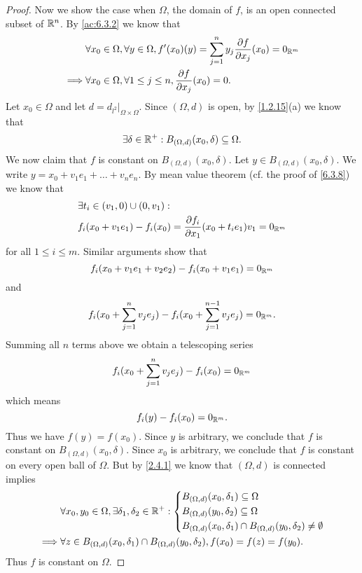\begin{proof}
  Now we show the case when \(\Omega\), the domain of \(f\), is an open connected subset of \(\mathbb{R}^n\).
  By \cref{ac:6.3.2} we know that
  \begin{align*}
             & \forall x_0 \in \Omega, \forall y \in \Omega, f'(x_0)(y) = \sum_{j = 1}^n y_j \dfrac{\partial f}{\partial x_j}(x_0) = 0_{\mathbb{R}^m} \\
    \implies & \forall x_0 \in \Omega, \forall 1 \leq j \leq n, \dfrac{\partial f}{\partial x_j}(x_0) = 0.
  \end{align*}
  Let \(x_0 \in \Omega\) and let \(d = d_{l^2}|_{\Omega \times \Omega}\).
  Since \((\Omega, d)\) is open, by \cref{1.2.15}(a) we know that
  \[
    \exists \delta \in \mathbb{R}^+ : B_{(\Omega, d)}(x_0, \delta) \subseteq \Omega.
  \]
  We now claim that \(f\) is constant on \(B_{(\Omega, d)}(x_0, \delta)\).
  Let \(y \in B_{(\Omega, d)}(x_0, \delta)\).
  We write \(y = x_0 + v_1 e_1 + \dots + v_n e_n\).
  By mean value theorem (cf. the proof of \cref{6.3.8}) we know that
  \begin{align*}
     & \exists t_i \in (v_1, 0) \cup (0, v_1) :                                                         \\
     & f_i(x_0 + v_1 e_1) - f_i(x_0) = \dfrac{\partial f_i}{\partial x_1}(x_0 + t_i e_1) v_1 = 0_{\mathbb{R}^m}
  \end{align*}
  for all \(1 \leq i \leq m\).
  Similar arguments show that
  \[
    f_i(x_0 + v_1 e_1 + v_2 e_2) - f_i(x_0 + v_1 e_1) = 0_{\mathbb{R}^m}
  \]
  and
  \[
    f_i(x_0 + \sum_{j = 1}^n v_j e_j) - f_i(x_0 + \sum_{j = 1}^{n - 1} v_j e_j) = 0_{\mathbb{R}^m}.
  \]
  Summing all \(n\) terms above we obtain a telescoping series
  \[
    f_i(x_0 + \sum_{j = 1}^n v_j e_j) - f_i(x_0) = 0_{\mathbb{R}^m}
  \]
  which means
  \[
    f_i(y) - f_i(x_0) = 0_{\mathbb{R}^m}.
  \]
  Thus we have \(f(y) = f(x_0)\).
  Since \(y\) is arbitrary, we conclude that \(f\) is constant on \(B_{(\Omega, d)}(x_0, \delta)\).
  Since \(x_0\) is arbitrary, we conclude that \(f\) is constant on every open ball of \(\Omega\).
  But by \cref{2.4.1} we know that \((\Omega, d)\) is connected implies
  \begin{align*}
             & \forall x_0, y_0 \in \Omega, \exists \delta_1, \delta_2 \in \mathbb{R}^+ : \begin{dcases}
                                                                                    B_{(\Omega, d)}(x_0, \delta_1) \subseteq \Omega \\
                                                                                    B_{(\Omega, d)}(y_0, \delta_2) \subseteq \Omega \\
                                                                                    B_{(\Omega, d)}(x_0, \delta_1) \cap B_{(\Omega, d)}(y_0, \delta_2) \neq \emptyset
                                                                                  \end{dcases} \\
    \implies & \forall z \in B_{(\Omega, d)}(x_0, \delta_1) \cap B_{(\Omega, d)}(y_0, \delta_2), f(x_0) = f(z) = f(y_0).
  \end{align*}
  Thus \(f\) is constant on \(\Omega\).
\end{proof}